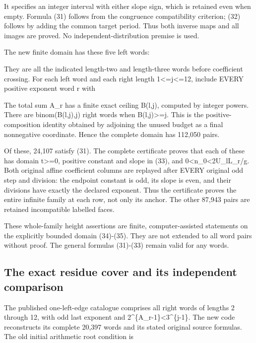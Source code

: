 
It specifies an integer interval with either slope sign, which is
retained even when empty. Formula (31) follows from the congruence
compatibility criterion; (32) follows by adding the common target
period. Thus both inverse maps and all images are proved. No
independent-distribution premise is used.

The new finite domain has these five left words:


They are all the indicated length-two and length-three words before
coefficient crossing. For each left word and each right length
1\textless=j\textless=12, include EVERY positive exponent word r with


The total sum A\_r has a finite exact ceiling B(l,j), computed by
integer powers. There are binom(B(l,j),j) right words when
B(l,j)\textgreater=j. This is the positive- composition identity
obtained by adjoining the unused budget as a final nonnegative
coordinate. Hence the complete domain has 112,050 pairs.

Of these, 24,107 satisfy (31). The complete certificate proves that each
of these has domain t\textgreater=0, positive constant and slope in
(33), and 0\textless n\_0\textless2U\_lL\_r/g. Both original affine
coefficient columns are replayed after EVERY original odd step and
division: the endpoint constant is odd, its slope is even, and their
divisions have exactly the declared exponent. Thus the certificate
proves the entire infinite family at each row, not only its anchor. The
other 87,943 pairs are retained incompatible labelled faces.

These whole-family height assertions are finite, computer-assisted
statements on the explicitly bounded domain (34)-(35). They are not
extended to all word pairs without proof. The general formulas (31)-(33)
remain valid for any words.

\subsection{The exact residue cover and its independent comparison}

The published one-left-edge catalogue comprises all right words of
lengths 2 through 12, with odd last exponent and
2\^{}\{A\_r-1\}\textless3\^{}\{j-1\}. The new code reconstructs its
complete 20,397 words and its stated original source formulas. The old
initial arithmetic root condition is

